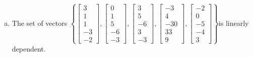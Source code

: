 \begin{exerciseAnswer}
\begin{enumerate}[(a)]
\item  The set of vectors \( \left\{ \left[\begin{array}{c}
3 \\
1 \\
1 \\
-3 \\
-2
\end{array}\right] , \left[\begin{array}{c}
0 \\
1 \\
5 \\
-6 \\
-3
\end{array}\right] , \left[\begin{array}{c}
3 \\
5 \\
-6 \\
3 \\
-3
\end{array}\right] , \left[\begin{array}{c}
-3 \\
4 \\
-30 \\
33 \\
9
\end{array}\right] , \left[\begin{array}{c}
-2 \\
0 \\
-5 \\
-4 \\
3
\end{array}\right] \right\} \)is linearly dependent.
\end{enumerate}
    
\end{exerciseAnswer}
    
